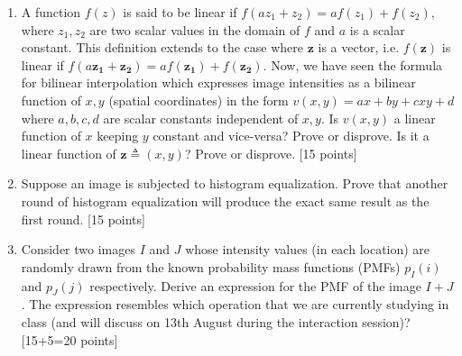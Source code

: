 \documentclass[11pt]{article}
\begin{document}
\begin{enumerate}
\item A function $f(z)$ is said to be linear if $f(az_1 + z_2) = a f(z_1) + f(z_2)$, where $z_1, z_2$ are two scalar values in the domain of $f$ and $a$ is a scalar constant. This definition extends to the case where $\boldsymbol{z}$ is a vector, i.e. $f(\boldsymbol{z})$ is linear if $f(a \boldsymbol{z_1} + \boldsymbol{z_2}) = a f(\boldsymbol{z_1}) + f(\boldsymbol{z_2})$. 
Now, we have seen the formula for bilinear interpolation which expresses image intensities as a bilinear function of $x,y$ (spatial coordinates) in the form $v(x,y) = ax + by + cxy + d$ where $a,b,c,d$ are scalar constants independent of $x,y$. Is $v(x,y)$ a linear function of $x$ keeping $y$ constant and vice-versa? Prove or disprove. Is it a linear function of $\boldsymbol{z} \triangleq (x,y)$? Prove or disprove. \textsf{[15 points]}

\item Suppose an image is subjected to histogram equalization. Prove that another round of histogram equalization will produce the exact same result as the first round. \textsf{[15 points]}

\item Consider two images $I$ and $J$ whose intensity values (in each location) are randomly drawn from the known probability mass functions (PMFs) $p_I(i)$ and $p_J(j)$ respectively. Derive an expression for the PMF of the image $I+J$. The expression resembles which operation that we are currently studying in class (and will discuss on 13th August during the interaction session)? \textsf{[15+5=20 points]}


\end{enumerate}
\end{document}
